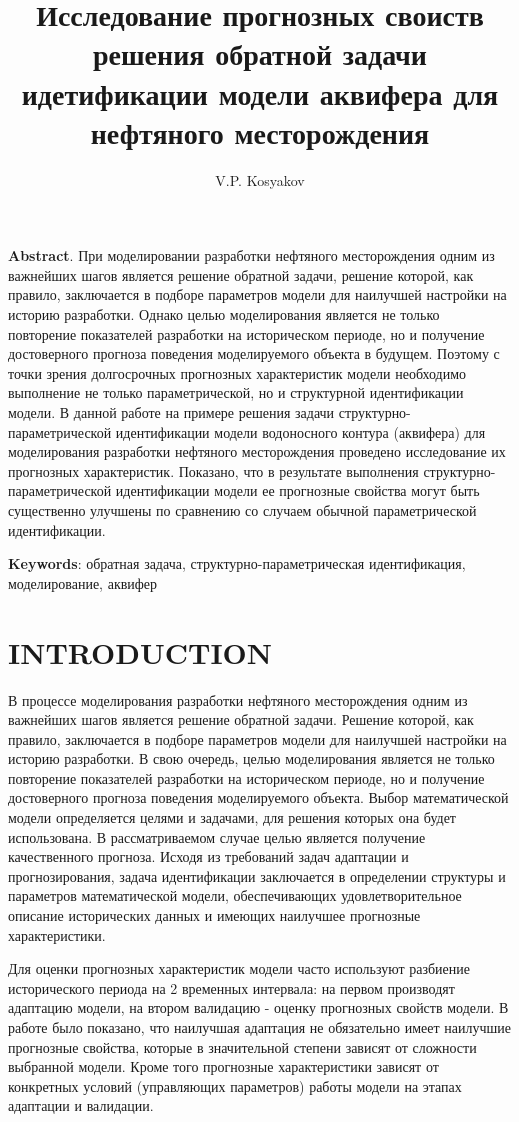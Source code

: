 \documentclass{article}
\title{Исследование прогнозных своиств решения обратной задачи идетификации модели аквифера для нефтяного месторождения}
\author{V.P. Kosyakov}
\begin{document}
	\maketitle
	\textbf{Abstract}. При моделировании разработки нефтяного месторождения одним из важнейших шагов является решение обратной задачи, решение которой, как правило, заключается в подборе параметров модели для наилучшей настройки на историю разработки. Однако целью моделирования является не только повторение показателей разработки на историческом периоде, но и получение достоверного прогноза поведения моделируемого объекта в будущем. Поэтому с точки зрения долгосрочных прогнозных характеристик модели необходимо выполнение не только параметрической, но и структурной идентификации модели.
В данной работе на примере решения задачи структурно-параметрической идентификации модели водоносного контура (аквифера) для моделирования разработки нефтяного месторождения проведено исследование их прогнозных характеристик. Показано, что в результате выполнения структурно-параметрической идентификации модели ее прогнозные свойства могут быть существенно улучшены по сравнению со случаем обычной параметрической идентификации. 

\textbf{Keywords}: обратная задача, структурно-параметрическая идентификация, моделирование, аквифер
\section{INTRODUCTION}
	В процессе моделирования разработки нефтяного месторождения одним из важнейших шагов является решение обратной задачи. Решение которой, как правило, заключается в подборе параметров модели для наилучшей настройки на историю разработки. В свою очередь, целью моделирования является не только повторение показателей разработки на историческом периоде, но и получение достоверного прогноза поведения моделируемого объекта. Выбор математической модели определяется целями и задачами, для решения которых она будет использована. В рассматриваемом случае целью является получение качественного прогноза. Исходя из требований задач адаптации и прогнозирования, задача идентификации заключается в определении структуры и параметров математической модели, обеспечивающих удовлетворительное описание исторических данных и имеющих наилучшее прогнозные характеристики.
	
	Для оценки прогнозных характеристик модели часто используют разбиение исторического периода на 2 временных интервала: на первом производят адаптацию модели, на втором валидацию - оценку прогнозных свойств модели. В работе \cite{mus} было показано, что наилучшая адаптация не обязательно имеет наилучшие прогнозные свойства, которые в значительной степени зависят от сложности выбранной модели. Кроме того прогнозные характеристики зависят от конкретных условий (управляющих параметров) работы модели на этапах адаптации и валидации.
	
\end{document}
